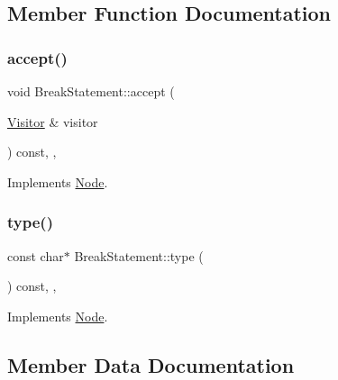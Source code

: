 \subsection{Member Function Documentation}
\mbox{\label{struct_break_statement_a915562cfa7dbbcadb0daecc3c3aa7d1f}} 
\subsubsection{\texorpdfstring{accept()}{accept()}}
{\footnotesize\ttfamily void Break\+Statement\+::accept (\begin{DoxyParamCaption}\item[{\hyperlink{struct_visitor}{Visitor} \&}]{visitor }\end{DoxyParamCaption}) const\hspace{0.3cm}{\ttfamily [inline]}, {\ttfamily [override]}, {\ttfamily [virtual]}}



Implements \hyperlink{struct_node_a10bd7af968140bbf5fa461298a969c71}{Node}.

\mbox{\label{struct_break_statement_aac8689184dead2a21c563a8a30448e80}} 
\subsubsection{\texorpdfstring{type()}{type()}}
{\footnotesize\ttfamily const char$\ast$ Break\+Statement\+::type (\begin{DoxyParamCaption}{ }\end{DoxyParamCaption}) const\hspace{0.3cm}{\ttfamily [inline]}, {\ttfamily [override]}, {\ttfamily [virtual]}}



Implements \hyperlink{struct_node_a82f29420d0a38efcc370352528e94e9b}{Node}.



\subsection{Member Data Documentation}
\mbox{\label{struct_break_statement_a42b738327adc45037878958ebb488113}} 
